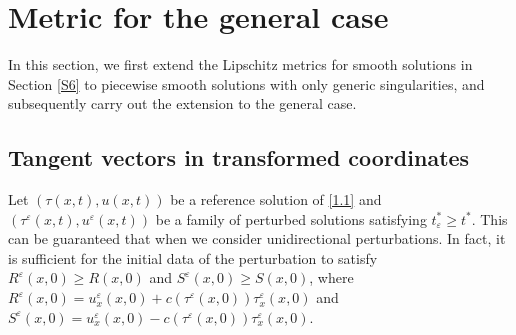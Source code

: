 \documentclass[11pt,reqno]{article}
\newcommand{\eps}{\varepsilon}
\numberwithin{equation}{section}
\begin{document}
\section{Metric for the general case}\label{S7}


In this section, we first extend the Lipschitz metrics for smooth solutions in Section \ref{S6} to piecewise smooth solutions with only generic singularities, and subsequently carry out the extension to the general case.


\subsection{Tangent vectors in transformed coordinates}\label{S71}

Let $(\tau(x,t), u(x,t))$ be a reference solution of \eqref{1.1} and $(\tau^\eps(x,t), u^\eps(x,t))$ be a family of perturbed solutions satisfying $t_{\eps}^*\geq t^*$. This can be guaranteed that when we consider unidirectional perturbations. In fact, it is sufficient for the initial data of the perturbation to satisfy $R^\eps(x,0)\geq R(x,0)$ and $S^\eps(x,0)\geq S(x,0)$, where $R^\eps(x,0)=u_{x}^\eps(x,0)+c(\tau^\eps(x,0))\tau_{x}^\eps(x,0)$ and $S^\eps(x,0)=u_{x}^\eps(x,0)-c(\tau^\eps(x,0))\tau_{x}^\eps(x,0)$.
\end{document}
